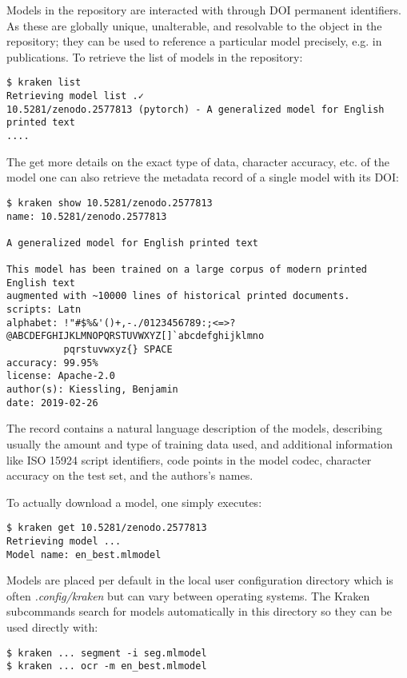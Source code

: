 Models in the repository are interacted with through DOI permanent identifiers.
As these are globally unique, unalterable, and resolvable to the object in the
repository; they can be used to reference a particular model precisely, e.g. in
publications. To retrieve the list of models in the repository:

\begin{verbatim}
$ kraken list
Retrieving model list .✓
10.5281/zenodo.2577813 (pytorch) - A generalized model for English printed text
....
\end{verbatim}

The get more details on the exact type of data, character accuracy, etc. of the
model one can also retrieve the metadata record of a single model with its DOI:

\begin{verbatim}
$ kraken show 10.5281/zenodo.2577813
name: 10.5281/zenodo.2577813

A generalized model for English printed text

This model has been trained on a large corpus of modern printed English text
augmented with ~10000 lines of historical printed documents.
scripts: Latn
alphabet: !"#$%&'()+,-./0123456789:;<=>?@ABCDEFGHIJKLMNOPQRSTUVWXYZ[]`abcdefghijklmno
          pqrstuvwxyz{} SPACE
accuracy: 99.95%
license: Apache-2.0
author(s): Kiessling, Benjamin
date: 2019-02-26
\end{verbatim}

The record contains a natural language description of the models, describing
usually the amount and type of training data used, and additional information
like ISO 15924 script identifiers, code points in the model codec, character
accuracy on the test set, and the authors's names.

To actually download a model, one simply executes:

\begin{verbatim}
$ kraken get 10.5281/zenodo.2577813
Retrieving model ...
Model name: en_best.mlmodel
\end{verbatim}

Models are placed per default in the local user configuration directory which
is often \emph{.config/kraken} but can vary between operating systems. The
Kraken subcommands search for models automatically in this directory so they
can be used directly with:

\begin{verbatim}
$ kraken ... segment -i seg.mlmodel
$ kraken ... ocr -m en_best.mlmodel
\end{verbatim}

